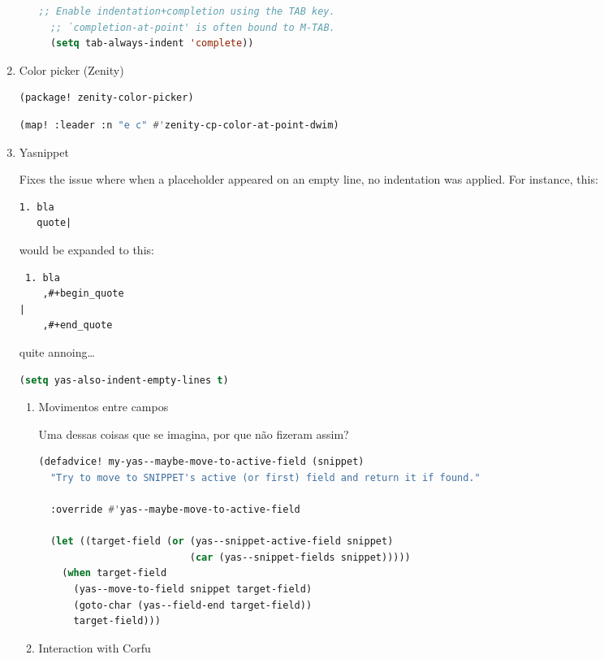 \documentclass[11pt]{article}
\begin{document}
\begin{enumerate}
\begin{enumerate}
\begin{lstlisting}[language=Lisp]
  ;; Enable indentation+completion using the TAB key.
  ;; `completion-at-point' is often bound to M-TAB.
  (setq tab-always-indent 'complete))
\end{lstlisting}
\end{enumerate}

  \item Color picker (Zenity)
  \label{sec:color-picker-zenity}

  \begin{lstlisting}[language=Lisp]
(package! zenity-color-picker)
\end{lstlisting}

\begin{lstlisting}[language=Lisp]
(map! :leader :n "e c" #'zenity-cp-color-at-point-dwim)
\end{lstlisting}
  \item Yasnippet
  \label{sec:yasnippet}

  Fixes the issue where when a placeholder appeared on an empty line, no
indentation was applied. For instance, this:

\begin{lstlisting}
1. bla
   quote|
\end{lstlisting}

would be expanded to this:

\begin{lstlisting}
 1. bla
    ,#+begin_quote
|
    ,#+end_quote
\end{lstlisting}

quite annoing…

\begin{lstlisting}[language=Lisp]
(setq yas-also-indent-empty-lines t)
\end{lstlisting}
\begin{enumerate}
  \item Movimentos entre campos
  \label{sec:movimentos-entre-campos}

  Uma dessas coisas que se imagina, por que não fizeram assim?

\begin{lstlisting}[language=Lisp]
(defadvice! my-yas--maybe-move-to-active-field (snippet)
  "Try to move to SNIPPET's active (or first) field and return it if found."

  :override #'yas--maybe-move-to-active-field

  (let ((target-field (or (yas--snippet-active-field snippet)
                          (car (yas--snippet-fields snippet)))))
    (when target-field
      (yas--move-to-field snippet target-field)
      (goto-char (yas--field-end target-field))
      target-field)))
\end{lstlisting}
  \item Interaction with Corfu
  \label{sec:interaction-with-corfu}


\end{enumerate}
\end{enumerate}
\end{document}

